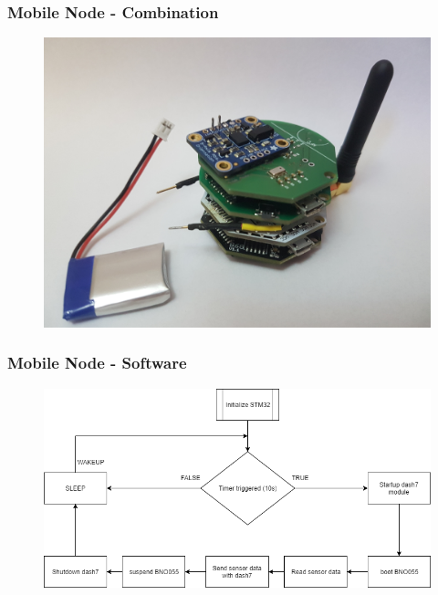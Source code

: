 \begin{frame}[fragile]
\frametitle{Mobile Node - Combination} 
\begin{figure}
  \centering
	\includegraphics[width=\textwidth]{images/mobile5.jpg}
\end{figure}
\end{frame}

\begin{frame}[fragile]
\frametitle{Mobile Node - Software} 
\begin{figure}
  \centering
	\includegraphics[width=\textwidth]{images/mobile6.png}
\end{figure}
\end{frame}

